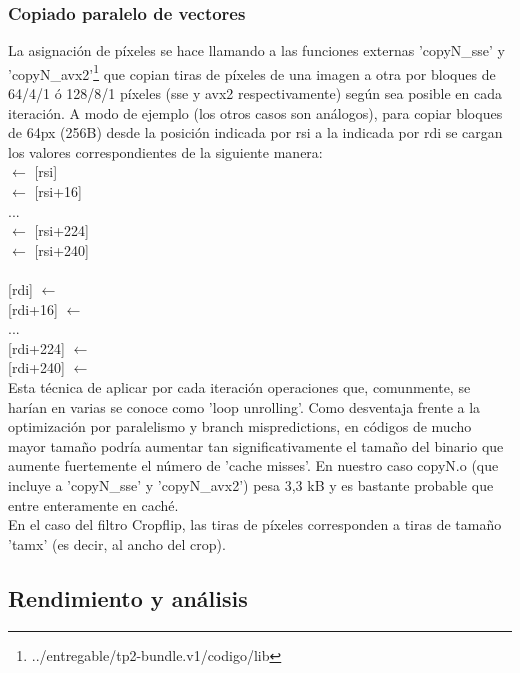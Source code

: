 \subsubsection{Copiado paralelo de vectores}
\label{explicacionCopyN}

La asignación de píxeles se hace llamando a las funciones externas 'copyN_sse' y 'copyN_avx2'\footnote{../entregable/tp2-bundle.v1/codigo/lib} que copian tiras de píxeles de una imagen a otra por bloques de 64/4/1 ó 128/8/1 píxeles (sse y avx2 respectivamente) según sea posible en cada iteración. A modo de ejemplo (los otros casos son análogos), para copiar bloques de 64px (256B) desde la posición indicada por rsi a la indicada por rdi se cargan los valores correspondientes de la siguiente manera:
\newline
\\
 $\leftarrow$ {[rsi]} \\
 $\leftarrow$ {[rsi+16]} \\
... \\
 $\leftarrow$ {[rsi+224]}  \\
 $\leftarrow$ {[rsi+240]} \\
\\
{[rdi]} $\leftarrow$  \\
{[rdi+16]} $\leftarrow$  \\
... \\
{[rdi+224]} $\leftarrow$  \\
{[rdi+240]} $\leftarrow$  \\

Esta técnica de aplicar por cada iteración operaciones que, comunmente, se harían en varias se conoce como 'loop unrolling'. Como desventaja frente a la optimización por paralelismo y branch mispredictions, en códigos de mucho mayor tamaño podría aumentar tan significativamente el tamaño del binario que aumente fuertemente el número de 'cache misses'. En nuestro caso copyN.o (que incluye a 'copyN_sse' y 'copyN_avx2') pesa 3,3 kB y es bastante probable que entre enteramente en caché.
\\

En el caso del filtro Cropflip, las tiras de píxeles corresponden a tiras de tamaño 'tamx' (es decir, al ancho del crop).  


\subsection{Rendimiento y análisis}

